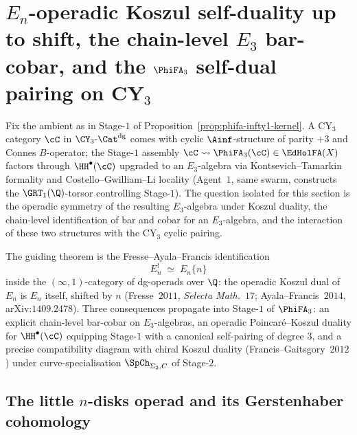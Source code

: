 \section*{$E_n$-operadic Koszul self-duality up to shift, the chain-level $E_3$ bar-cobar, and the $\PhiFA_3$ self-dual pairing on CY$_3$}
\label{sec:agent-11-e3-bar-cobar-koszul-cfg2026}

Fix the ambient as in Stage-$1$ of Proposition~\ref{prop:phifa-infty1-kernel}.
A CY$_3$ category $\cC$ in $\CY_3\text{-}\Cat^{\mathrm{dg}}$ comes with
cyclic $\Ainf$-structure of parity $+3$ and Connes $B$-operator; the
Stage-$1$ assembly $\cC \leadsto \PhiFA_3(\cC) \in \EdHolFA(X)$ factors
through $\HH^\bullet(\cC)$ upgraded to an $E_3$-algebra via
Kontsevich--Tamarkin formality and Costello--Gwilliam--Li locality
(Agent~$1$, same swarm, constructs the $\GRT_1(\Q)$-torsor controlling
Stage-$1$). The question isolated for this section is the operadic
symmetry of the resulting $E_3$-algebra under Koszul duality, the
chain-level identification of bar and cobar for an $E_3$-algebra, and
the interaction of these two structures with the CY$_3$ cyclic pairing.

The guiding theorem is the Fresse--Ayala--Francis identification
\[
  E_n^{!} \;\simeq\; E_n\{n\}
\]
inside the $(\infty,1)$-category of dg-operads over $\Q$: the operadic
Koszul dual of $E_n$ is $E_n$ itself, shifted by $n$ (Fresse~$2011$,
\textit{Selecta Math.}~$17$; Ayala--Francis~$2014$,
arXiv:$1409.2478$). Three consequences propagate into Stage-$1$ of
$\PhiFA_3$: an explicit chain-level bar-cobar on $E_3$-algebras, an
operadic Poincar\'e--Koszul duality for $\HH^\bullet(\cC)$ equipping
Stage-$1$ with a canonical self-pairing of degree $3$, and a precise
compatibility diagram with chiral Koszul duality
(Francis--Gaitsgory~$2012$) under curve-specialisation $\SpCh_{\Sigma_2, C}$
of Stage-$2$.

\subsection*{The little $n$-disks operad and its Gerstenhaber cohomology}

